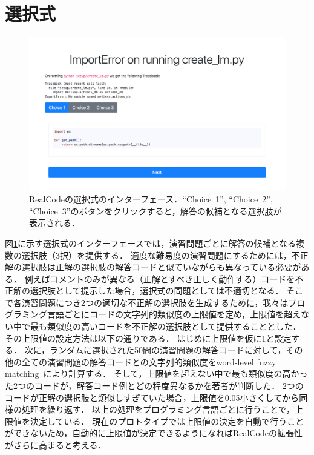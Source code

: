 

\section{選択式}
\begin{figure}[t]
	\centering
  \includegraphics[width=1.0\columnwidth]{20181228-interface-mcq.png}
  \caption{RealCodeの選択式のインターフェース．``Choice~1'', ``Choice~2'', ``Choice~3''のボタンをクリックすると，解答の候補となる選択肢が表示される．}
  \label{fig:mcq}
\end{figure}

図\ref{fig:mcq}に示す選択式のインターフェースでは，演習問題ごとに解答の候補となる複数の選択肢（3択）を提供する．
適度な難易度の演習問題にするためには，不正解の選択肢は正解の選択肢の解答コードと似ていながらも異なっている必要がある．
例えばコメントのみが異なる（正解とすべき正しく動作する）コードを不正解の選択肢として提示した場合，選択式の問題としては不適切となる．
そこで各演習問題につき2つの適切な不正解の選択肢を生成するために，我々はプログラミング言語ごとにコードの文字列的類似度の上限値を定め，上限値を超えない中で最も類似度の高いコードを不正解の選択肢として提供することとした．
その上限値の設定方法は以下の通りである．
はじめに上限値を仮に1と設定する．
次に，ランダムに選択された50問の演習問題の解答コードに対して，その他の全ての演習問題の解答コードとの文字列的類似度をword-level fuzzy matching~\cite{sankoff1983time}により計算する．
そして，上限値を超えない中で最も類似度の高かった2つのコードが，解答コード例とどの程度異なるかを著者が判断した．
2つのコードが正解の選択肢と類似しすぎていた場合，上限値を0.05小さくしてから同様の処理を繰り返す．
以上の処理をプログラミング言語ごとに行うことで，上限値を決定している．
現在のプロトタイプでは上限値の決定を自動で行うことができないため，自動的に上限値が決定できるようになればRealCodeの拡張性がさらに高まると考える．



